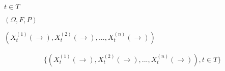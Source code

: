 \begin{preview}
\setcounter{equation}{0}%
\(t \in T\)
\end{preview}

\begin{preview}
\setcounter{equation}{0}%
\((\Omega, F, P)\)
\end{preview}

\begin{preview}
\setcounter{equation}{0}%
\((X_t^{(1)}(\rightarrow),X_t^{(2)}(\rightarrow),...,X_t^{(n)}(\rightarrow))\)
\end{preview}

\begin{preview}
\setcounter{equation}{0}%
\begin{align}
  \{(X_t^{(1)}(\rightarrow),X_t^{(2)}(\rightarrow),...,X_t^{(n)}(\rightarrow)), t\in T\}
\end{align}

\end{preview}


